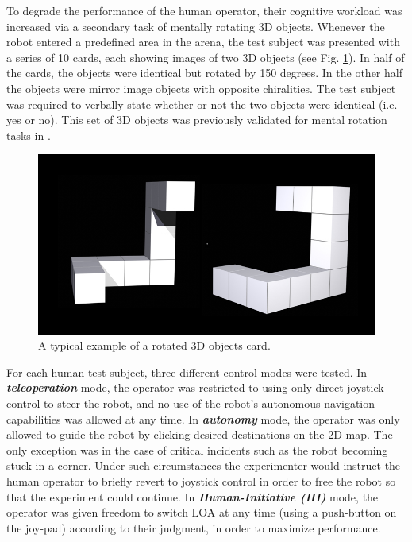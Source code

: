 \documentclass[a4paper,12pt,oneside,openright]{bhamthesis}
\begin{document}
To degrade the performance of the human operator, their cognitive workload was increased via a secondary task of mentally rotating 3D objects. Whenever the robot entered a predefined area in the arena, the test subject was presented with a series of 10 cards, each showing images of two 3D objects (see Fig. \ref{fig:rotation_task_exp2}). In half of the cards, the objects were identical but rotated by 150 degrees. In the other half the objects were mirror image objects with opposite chiralities. The test subject was required to verbally state whether or not the two objects were identical (i.e. yes or no). This set of 3D objects was previously validated for mental rotation tasks in \cite{Ganis2015}.
	
	\begin{figure}
		\centering
		\includegraphics[width=0.45\columnwidth]{chapter4_fig/rotation_example.jpg}
		\caption{A typical example of a rotated 3D objects card.} 
		\label{fig:rotation_task_exp2}
	\end{figure}
	
For each human test subject, three different control modes were tested. In \textbf{\textit{teleoperation}} mode, the operator was restricted to using only direct joystick control to steer the robot, and no use of the robot's autonomous navigation capabilities was allowed at any time. In \textbf{\textit{autonomy}} mode, the operator was only allowed to guide the robot by clicking desired destinations on the 2D map. The only exception was in the case of critical incidents such as the robot becoming stuck in a corner. Under such circumstances the experimenter would instruct the human operator to briefly revert to joystick control in order to free the robot so that the experiment could continue. In \textbf{\textit{Human-Initiative (HI)}} mode, the operator was given freedom to switch LOA at any time (using a push-button on the joy-pad) according to their judgment, in order to maximize performance. 
\end{document}
